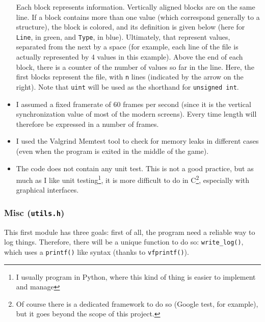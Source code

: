 \documentclass[12pt,a4paper]{article}
\newcommand{\cc}[1]{\texttt{#1}}
\begin{document}
\begin{itemize}
\begin{center}
\end{center}
Each block represents information. Vertically aligned blocks are on the same line. If a block contains more than one value (which correspond generally to a structure), the block is colored, and its definition is given below (here for \texttt{Line}, in green, and \texttt{Type}, in blue). Ultimately, that represent values, separated from the next by a space (for example, each line of the file is actually represented by 4 values in this example). Above the end of each block, there is a counter of the number of values so far in the line.
Here, the first blocks represent the file, with \texttt{n} lines (indicated by the arrow on the right). Note that \texttt{uint} will be used as the shorthand for \cc{unsigned int}.
\item I assumed  a fixed framerate of 60 frames per second (since it is the vertical synchronization value of most of the modern screens). Every time length will therefore be expressed in a number of frames. 
\item I used the Valgrind Memtest tool \cite{valgrind} to check for memory leaks in different cases (even when the program is exited in the middle of the game).
\item The code does not contain any unit test. This is not a good practice, but as much as I like unit testing\footnote{I usually program in Python, where this kind of thing is easier to implement and manage}, it is more difficult to do in C\footnote{Of course there is a dedicated framework to do so (Google test, for example), but it goes beyond the scope of this project.}, especially with graphical interfaces.
\end{itemize}

\subsubsection{Misc (\texttt{utils.h})}

This first module has three goals: first of all, the program need a reliable way to log things. Therefore, there will be a unique function to do so: \cc{write_log()}, which uses a \cc{printf()} like syntax (thanks to \cc{vfprintf()}).
\end{document}
